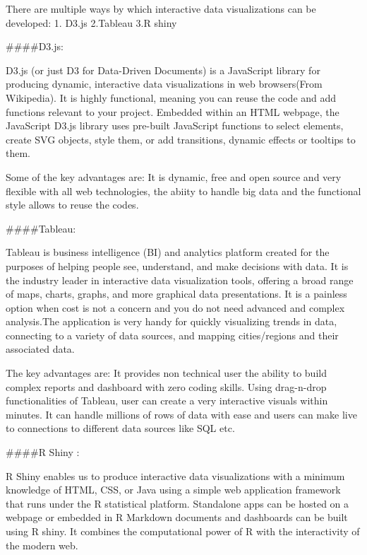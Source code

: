 \documentclass[]{book}
\theoremstyle{definition}
\theoremstyle{definition}
\theoremstyle{definition}
\theoremstyle{remark}
\begin{document}
\citep{benefits_interactive_viz}

There are multiple ways by which interactive data visualizations can be
developed: 1. D3.js 2.Tableau 3.R shiny

\#\#\#\#D3.js:

D3.js (or just D3 for Data-Driven Documents) is a JavaScript library for
producing dynamic, interactive data visualizations in web browsers(From
Wikipedia). It is highly functional, meaning you can reuse the code and
add functions relevant to your project. Embedded within an HTML webpage,
the JavaScript D3.js library uses pre-built JavaScript functions to
select elements, create SVG objects, style them, or add transitions,
dynamic effects or tooltips to them.

Some of the key advantages are: It is dynamic, free and open source and
very flexible with all web technologies, the abiity to handle big data
and the functional style allows to reuse the codes.

\citep{d3_interactive_viz}

\#\#\#\#Tableau:

Tableau is business intelligence (BI) and analytics platform created for
the purposes of helping people see, understand, and make decisions with
data. It is the industry leader in interactive data visualization tools,
offering a broad range of maps, charts, graphs, and more graphical data
presentations. It is a painless option when cost is not a concern and
you do not need advanced and complex analysis.The application is very
handy for quickly visualizing trends in data, connecting to a variety of
data sources, and mapping cities/regions and their associated data.

The key advantages are: It provides non technical user the ability to
build complex reports and dashboard with zero coding skills. Using
drag-n-drop functionalities of Tableau, user can create a very
interactive visuals within minutes. It can handle millions of rows of
data with ease and users can make live to connections to different data
sources like SQL etc.

\citep{tableau_interactive_viz}

\#\#\#\#R Shiny :

R Shiny enables us to produce interactive data visualizations with a
minimum knowledge of HTML, CSS, or Java using a simple web application
framework that runs under the R statistical platform. Standalone apps
can be hosted on a webpage or embedded in R Markdown documents and
dashboards can be built using R shiny. It combines the computational
power of R with the interactivity of the modern web.
\end{document}
